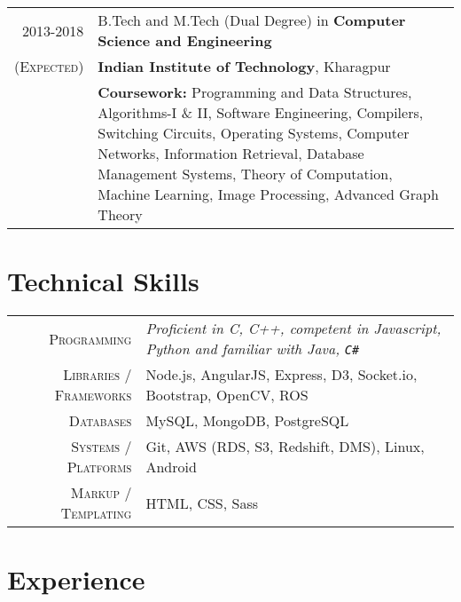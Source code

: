 \documentclass[a4paper,10pt]{extarticle} %
\begin{document}
\begin{tabular}{r|p{17.5cm}}	
2013-2018 & B.Tech and M.Tech (Dual Degree) in \textbf{Computer Science and Engineering}\\
\textsc{(Expected)}&\textbf{Indian Institute of Technology}, Kharagpur\\
&\textbf{Coursework: }{Programming and Data Structures, Algorithms-I \& II, Software Engineering, Compilers, Switching Circuits, Operating Systems, Computer Networks, Information Retrieval, Database Management Systems, Theory of Computation, Machine Learning, Image Processing, Advanced Graph Theory}
\end{tabular}


\section{Technical Skills}

\begin{tabular}{r|p{17.5cm}}
\textsc{Programming} & \itshape{Proficient in} C, C++, \itshape{competent in} Javascript, Python and \itshape{familiar with} Java, \verb!C#! \\
\textsc{Libraries / Frameworks} & Node.js, AngularJS, Express, D3, Socket.io, Bootstrap, OpenCV, ROS\\
\textsc{Databases} & MySQL, MongoDB, PostgreSQL\\
\textsc{Systems / Platforms} & Git, AWS (RDS, S3, Redshift, DMS), Linux, Android\\
\textsc{Markup / Templating} & HTML, CSS, Sass
\end{tabular}

\section{Experience}
\end{document}
